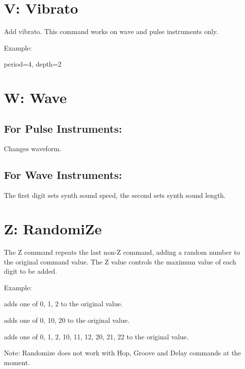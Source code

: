 \section{V: Vibrato}

Add vibrato. This command works on wave and pulse instruments only.

\begin{description}
\item Example:
\item[V42] period=4, depth=2
\end{description}

\section{W: Wave}

\subsection{For Pulse Instruments:}
Changes waveform.

\subsection{For Wave Instruments:}
The first digit sets synth sound speed, the second sets synth sound length.

\section{Z: RandomiZe}

The Z command repeats the last non-Z command, adding a random number to the original command value. The Z value controls the maximum value of each digit to be added.

\begin{description}
\item Example:
\item[Z02] adds one of 0, 1, 2 to the original value.
\item[Z20] adds one of 0, 10, 20 to the original value.
\item[Z22] adds one of 0, 1, 2, 10, 11, 12, 20, 21, 22 to the original value.
\end{description}

Note: Randomize does not work with Hop, Groove and Delay commands at the moment.
